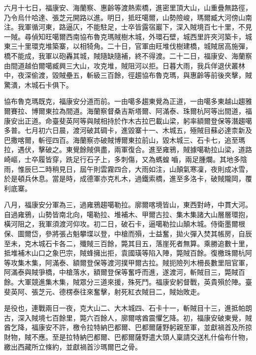 \begin{pinyinscope}
六月十七日，福康安、海蘭察、惠齡等渡熱索橋，進密里頂大山，山重疊無路徑，乃令烏什哈達、張芝元開路以進。明日，抵旺噶爾，山勢險峻，瑪爾臧大河傍山南注。我軍循河東，路逼仄，不能駐足，士卒皆露宿巖下，深入賊境百七十里，不見一賊。尋偵知旺噶爾西南協布魯克瑪賊樹木城，外環石壁，城西里許夾河築卡，城東三十里環克堆築寨，以相犄角。二十日，官軍由旺堆伐樹建橋，城賊居高施彈，橋不能成，我軍以砲轟其城，賊隨缺隨補，終不得渡。二十二日，福康安、海蘭察由間道越伯爾噶臧興三大山，攻克堆，賊阻河以拒。日暮大雨，我兵佯退伏叢林中，夜深偷渡，毀賊壘五，斬級三百餘，徑趨協布魯克瑪，與惠齡等前後夾擊，賊驚潰，木城石卡俱下。

協布魯克瑪既克，福康安分道而前。一由噶多趨東覺為正道，一由噶多東越山趨雅爾賽拉、博爾東拉為間道。海蘭察督桑吉斯塔爾、阿滿泰、珠爾杭阿等出間道，福康安出正道。命臺斐英阿等與賊相持於作木古拉巴載山梁，躬率額爾登保等潛趨噶多普。七月初六日晨，渡河破其碉卡，進毀寨十一、木城五，殛賊目蘇必達柰新及巴撒喀爾，斬徑四百。海蘭察亦破賊博爾東拉前山，毀木城三、石卡七，追至瑪拉，遇伏，擊破之。東覺餘賊俱盡，兩軍復合。進至雍鴉，賊據噶勒拉山梁，道路崎嶇，士卒履皆穿，跣足行石子上，多刺傷，又為螞蝗嚙，兩足腫爛。其地多陰雨，惟辰巳二時稍見日，屆午則雲霧四合，大雨如注，山顛氣寒凜，夜則成冰雪，於是頓兵休息。當是時，成德軍亦克札木，過鐵索橋，進至多洛卡，破賊隴岡，覆利底寨。

八月，福康安分軍為三，過雍鴉趨噶勒拉。廓爾喀境皆山，東西對峙，中貫大河。自過雍鴉，山勢皆南北向，噶勒拉、堆補木、甲爾古拉、集木集諸大山層層環抱，橫河阻之，我軍須渡河仰攻。初二日，破石卡，逼噶勒拉山顛木城。侍衛墨爾根保、圖爾岱，參將張占魁攀堞以登，中槍而殞，士益奮，拋火彈入焚其帳房，自辰至未，克木城石卡各二，殲賊三百餘，斃其目五，落崖死者無算。乘勝追數十里，抵堆補木山口之象巴宗，賊蜂擁出拒，袁國璜等陷入陣，斃賊百餘。復檄珠爾杭阿等攻集木集，阿滿泰、額爾登保等渡河撲甲爾古拉。賊扼險列木柵長數里阻官軍，阿滿泰與賊爭橋，中槍落水，額爾登保等奮呼而進，遂渡河，斬賊目三，斃賊百餘。大軍競進集木集，賊眾分三道來援，殊死鬥。福康安躬督戰，英貴殞於陣。臺斐英阿、張芝元、德楞泰往來奮擊，射死紅衣賊目二，賊始敗走。

是役也，連戰兩日一夜，克大山二、大木城四、石卡十一，斬賊目十三，進抵帕朗古，深入賊境七百餘里，斃六百餘人，廓爾喀酋震懼乞降。初，福康安破東覺，賊酋乞降，福康安不許，檄令拉特納巴都爾、巴都爾薩野躬親至軍，並獻禍首及所掠財物，賊不應。至是拉特納巴都爾、巴都爾薩野遣大頭人稟請交送札什倫布什物，繳出西藏所立條約，並獻禍首沙瑪爾巴之骨。


\end{pinyinscope}
